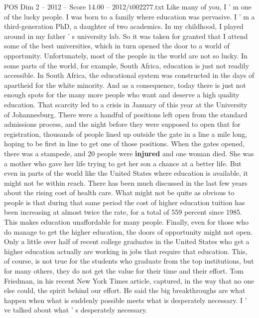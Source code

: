 \begin{textsample}{POS Dim 2 – 2012 – Score 14.00 – 2012/t002277.txt}  \label{ex:f2_pos_070}
Like many of you, I ' m one of the lucky people.
I was born to a family where education was pervasive.
I ' m a third-generation PhD, a daughter of two academics.
In my childhood, I played around in my father ' s university lab.
So it was taken for granted that I attend some of the best universities, which in turn opened the door to a world of opportunity.
Unfortunately, most of the people in the world are not so lucky.
In some parts of the world, for example, South Africa, education is just not readily accessible.
In South Africa, the educational system was constructed in the days of apartheid for the white minority.
And as a consequence, today there is just not enough spots for the many more people who want and deserve a high quality education.
That scarcity led to a crisis in January of this year at the University of Johannesburg.
There were a handful of positions left open from the standard admissions process, and the night before they were supposed to open that for registration, thousands of people lined up outside the gate in a line a mile long, hoping to be first in line to get one of those positions.
When the gates opened, there was a stampede, and 20 people were \textbf{injured} and one woman died.
She was a mother who gave her life trying to get her son a chance at a better life.
But even in parts of the world like the United States where education is available, it might not be within reach.
There has been much discussed in the last few years about the rising cost of health care.
What might not be quite as obvious to people is that during that same period the cost of higher education tuition has been increasing at almost twice the rate, for a total of 559 percent since 1985.
This makes education unaffordable for many people.
Finally, even for those who do manage to get the higher education, the doors of opportunity might not open.
Only a little over half of recent college graduates in the United States who get a higher education actually are working in jobs that require that education.
This, of course, is not true for the students who graduate from the top institutions, but for many others, they do not get the value for their time and their effort.
Tom Friedman, in his recent New York Times article, captured, in the way that no one else could, the spirit behind our effort.
He said the big breakthroughs are what happen when what is suddenly possible meets what is desperately necessary.
I ' ve talked about what ' s desperately necessary.

\end{textsample}
